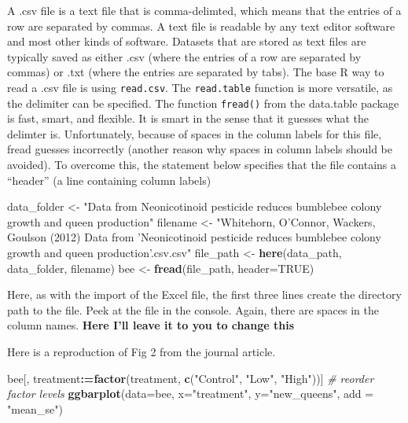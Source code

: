 \documentclass[]{book}
\newenvironment{Shaded}{\begin{snugshade}}{\end{snugshade}}
\newcommand{\KeywordTok}[1]{\textcolor[rgb]{0.13,0.29,0.53}{\textbf{#1}}}
\newcommand{\DataTypeTok}[1]{\textcolor[rgb]{0.13,0.29,0.53}{#1}}
\newcommand{\StringTok}[1]{\textcolor[rgb]{0.31,0.60,0.02}{#1}}
\newcommand{\CommentTok}[1]{\textcolor[rgb]{0.56,0.35,0.01}{\textit{#1}}}
\newcommand{\OtherTok}[1]{\textcolor[rgb]{0.56,0.35,0.01}{#1}}
\newcommand{\OperatorTok}[1]{\textcolor[rgb]{0.81,0.36,0.00}{\textbf{#1}}}
\newcommand{\ErrorTok}[1]{\textcolor[rgb]{0.64,0.00,0.00}{\textbf{#1}}}
\newcommand{\NormalTok}[1]{#1}
\begin{document}
A .csv file is a text file that is comma-delimted, which means that the
entries of a row are separated by commas. A text file is readable by any
text editor software and most other kinds of software. Datasets that are
stored as text files are typically saved as either .csv (where the
entries of a row are separated by commas) or .txt (where the entries are
separated by tabs). The base R way to read a .csv file is using
\texttt{read.csv}. The \texttt{read.table} function is more versatile,
as the delimiter can be specified. The function \texttt{fread()} from
the data.table package is fast, smart, and flexible. It is smart in the
sense that it guesses what the delimter is. Unfortunately, because of
spaces in the column labels for this file, fread guesses incorrectly
(another reason why spaces in column labels should be avoided). To
overcome this, the statement below specifies that the file contains a
``header'' (a line containing column labels)

\begin{Shaded}
\begin{Highlighting}[]
\NormalTok{data_folder <-}\StringTok{ "Data from Neonicotinoid pesticide reduces bumblebee colony growth and queen production"}
\NormalTok{filename <-}\StringTok{ "Whitehorn, O'Connor, Wackers, Goulson (2012) Data from 'Neonicotinoid pesticide reduces bumblebee colony growth and queen production'.csv.csv"}
\NormalTok{file_path <-}\StringTok{ }\KeywordTok{here}\NormalTok{(data_path, data_folder, filename)}
\NormalTok{bee <-}\StringTok{ }\KeywordTok{fread}\NormalTok{(file_path, }\DataTypeTok{header=}\OtherTok{TRUE}\NormalTok{)}
\end{Highlighting}
\end{Shaded}

Here, as with the import of the Excel file, the first three lines create
the directory path to the file. Peek at the file in the console. Again,
there are spaces in the column names. \textbf{Here I'll leave it to you
to change this}

Here is a reproduction of Fig 2 from the journal article.

\begin{Shaded}
\begin{Highlighting}[]
\NormalTok{bee[, treatment}\OperatorTok{:}\ErrorTok{=}\KeywordTok{factor}\NormalTok{(treatment, }\KeywordTok{c}\NormalTok{(}\StringTok{"Control"}\NormalTok{, }\StringTok{"Low"}\NormalTok{, }\StringTok{"High"}\NormalTok{))] }\CommentTok{# reorder factor levels}
\KeywordTok{ggbarplot}\NormalTok{(}\DataTypeTok{data=}\NormalTok{bee, }\DataTypeTok{x=}\StringTok{"treatment"}\NormalTok{, }\DataTypeTok{y=}\StringTok{"new_queens"}\NormalTok{, }\DataTypeTok{add =} \StringTok{"mean_se"}\NormalTok{)}
\end{Highlighting}
\end{Shaded}
\end{document}

